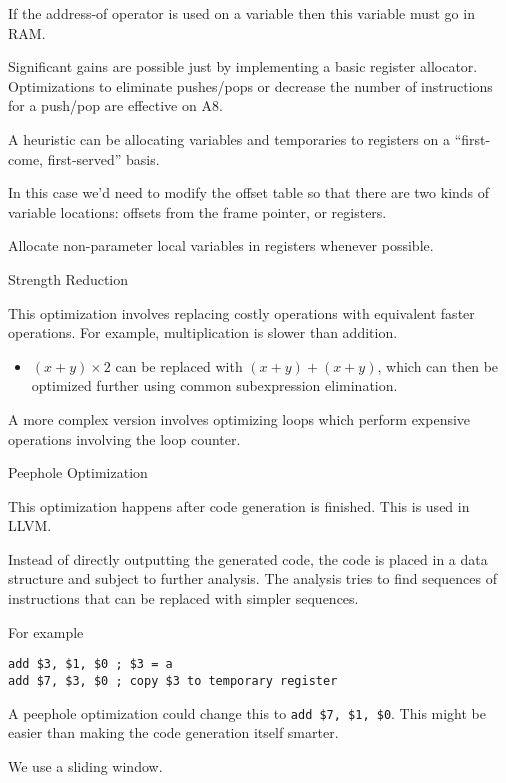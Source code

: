 \documentclass{article}
\begin{document}
If the address-of operator is used on a variable then this variable must
go in RAM.

Significant gains are possible just by implementing a basic register
allocator. Optimizations to eliminate pushes/pops or decrease the number
of instructions for a push/pop are effective on A8.

A heuristic can be allocating variables and temporaries to registers on
a ``first-come, first-served'' basis.

In this case we'd need to modify the offset table so that there are two
kinds of variable locations: offsets from the frame pointer, or
registers.

Allocate non-parameter local variables in registers whenever possible.

Strength Reduction

This optimization involves replacing costly operations with equivalent
faster operations. For example, multiplication is slower than addition.

\begin{itemize}
    \item \((x + y) \times 2\) can be replaced with \((x + y) + (x + y)\), which
can then be optimized further using common subexpression elimination.
\end{itemize}

A more complex version involves optimizing loops which perform expensive
operations involving the loop counter.

Peephole Optimization

This optimization happens after code generation is finished. This is
used in LLVM.

Instead of directly outputting the generated code, the code is placed in
a data structure and subject to further analysis. The analysis tries to
find sequences of instructions that can be replaced with simpler
sequences.

For example

\begin{tcolorbox}
\begin{verbatim}
add $3, $1, $0 ; $3 = a
add $7, $3, $0 ; copy $3 to temporary register
\end{verbatim}
\end{tcolorbox}

A peephole optimization could change this to
\texttt{add\ \$7,\ \$1,\ \$0}. This might be easier than making the code
generation itself smarter.

We use a sliding window.
\end{document}
